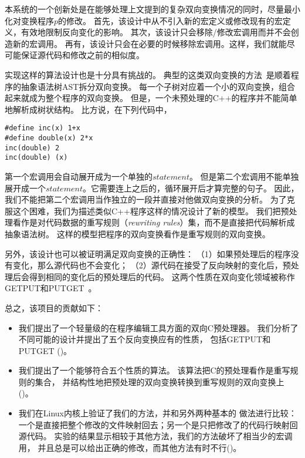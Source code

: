 
本系统的一个创新处是在能够处理上文提到的复杂双向变换情况的同时，尽量最小化对变换程序$p$的修改。
首先，该设计中从不引入新的宏定义或修改现有的宏定义，有效地限制反向变化的影响。
其次，该设计只会移除/修改宏调用而并不会创造新的宏调用。
再有，该设计只会在必要的时候移除宏调用。这样，我们就能尽可能保证源代码和修改之前的相似度。


实现这样的算法设计也是十分具有挑战的。
典型的这类双向变换的方法~\parencite{MaHNHT07,Voigtlander09bff,MMHT10}是顺着程序的抽象语法树AST拆分双向变换。
每一个子树对应着一个小的双向变换，组合起来就成为整个程序的双向变换。
但是，一个未预处理的C++的程序并不能简单地解析成树状结构。
比方说，在下列代码中，
\begin{lstlisting}
#define inc(x) 1+x
#define double(x) 2*x
inc(double) 2
inc(double) (x)
\end{lstlisting}
第一个宏调用会自动展开成为一个单独的$statement$。
但是第二个宏调用不能单独展开成一个$statement$。它需要连上之后的，循环展开后才算完整的句子。
因此，我们不能把第二个宏调用当作独立的一段并直接对他做双向变换的分析。
为了克服这个困难，我们为描述类似C++程序这样的情况设计了新的模型。
我们把预处理看作是对代码数据的重写规则（\emph{rewriting rules}）集，而不是直接把代码解析成抽象语法树。
这样的模型把程序的双向变换看作是重写规则的双向变换。


另外，该设计也可以被证明满足双向变换的正确性：
（1）如果预处理后的程序没有变化，那么源代码也不会变化；
（2）源代码在接受了反向映射的变化后，预处理后会得到相同的变化后的预处理后的代码。
这两个性质在双向变化领域被称作GETPUT和PUTGET~\parencite{Foster:2007}。

总之，该项目的贡献如下：
\begin{itemize}
\item 我们提出了一个轻量级的在程序编辑工具方面的双向C预处理器。
	我们分析了不同可能的设计并提出了五个反向变换应有的性质，
	包括GETPUT和PUTGET
	()。
\item 我们提出了一个能够符合五个性质的算法。
	该算法把C的预处理看作是重写规则的集合，
	并结构性地把预处理的双向变换转换到重写规则的双向变换上
	()。
\item 我们在Linux内核上验证了我们的方法，并和另外两种基本的
	做法进行比较：一个是直接把整个修改的文件映射回去；另一个是只把修改了的代码行映射回源代码。
	实验的结果显示相较于其他方法，我们的方法破坏了相当少的宏调用，
	并且总是可以给出正确的修改，而其他方法有时不行()。
\end{itemize}

